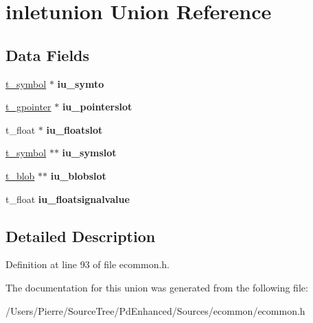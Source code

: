 \hypertarget{unioninletunion}{\section{inletunion Union Reference}
\label{unioninletunion}
}
\subsection*{Data Fields}
\begin{DoxyCompactItemize}
\item 
\hypertarget{unioninletunion_a034ef76c9ac47aad410c151b1a3072ed}{\hyperlink{struct__symbol}{t\-\_\-symbol} $\ast$ {\bfseries iu\-\_\-symto}}\label{unioninletunion_a034ef76c9ac47aad410c151b1a3072ed}

\item 
\hypertarget{unioninletunion_a765f6acce4359fbeaebd130279fdd899}{\hyperlink{struct__gpointer}{t\-\_\-gpointer} $\ast$ {\bfseries iu\-\_\-pointerslot}}\label{unioninletunion_a765f6acce4359fbeaebd130279fdd899}

\item 
\hypertarget{unioninletunion_a4ea31644c26b1c46f9541353b293d3f6}{t\-\_\-float $\ast$ {\bfseries iu\-\_\-floatslot}}\label{unioninletunion_a4ea31644c26b1c46f9541353b293d3f6}

\item 
\hypertarget{unioninletunion_a347eb160d2e6d55719beabdae51a2ac9}{\hyperlink{struct__symbol}{t\-\_\-symbol} $\ast$$\ast$ {\bfseries iu\-\_\-symslot}}\label{unioninletunion_a347eb160d2e6d55719beabdae51a2ac9}

\item 
\hypertarget{unioninletunion_aa5bed621c07aa6838a05e81384933715}{\hyperlink{struct__blob}{t\-\_\-blob} $\ast$$\ast$ {\bfseries iu\-\_\-blobslot}}\label{unioninletunion_aa5bed621c07aa6838a05e81384933715}

\item 
\hypertarget{unioninletunion_a4b62c62214438358765fee52d88ac7c5}{t\-\_\-float {\bfseries iu\-\_\-floatsignalvalue}}\label{unioninletunion_a4b62c62214438358765fee52d88ac7c5}

\end{DoxyCompactItemize}


\subsection{Detailed Description}


Definition at line 93 of file ecommon.\-h.



The documentation for this union was generated from the following file\-:\begin{DoxyCompactItemize}
\item 
/\-Users/\-Pierre/\-Source\-Tree/\-Pd\-Enhanced/\-Sources/ecommon/ecommon.\-h\end{DoxyCompactItemize}
